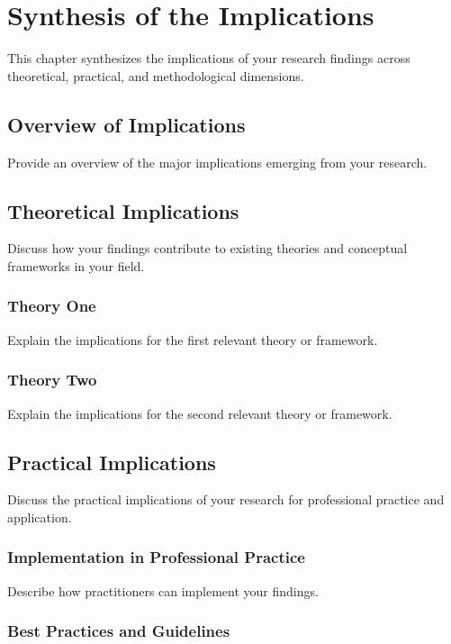 \chapter{Synthesis of the Implications}

This chapter synthesizes the implications of your research findings across theoretical, practical, and methodological dimensions.

\section{Overview of Implications}

Provide an overview of the major implications emerging from your research.

\section{Theoretical Implications}

Discuss how your findings contribute to existing theories and conceptual frameworks in your field.

\subsection{Theory One}

Explain the implications for the first relevant theory or framework.

\subsection{Theory Two}

Explain the implications for the second relevant theory or framework.

\section{Practical Implications}

Discuss the practical implications of your research for professional practice and application.

\subsection{Implementation in Professional Practice}

Describe how practitioners can implement your findings.

\subsection{Best Practices and Guidelines}

